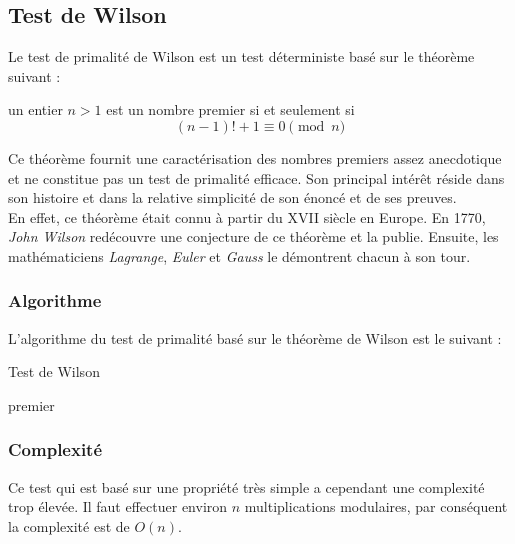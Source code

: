 \subsection{Test de Wilson}
	Le test de primalité de Wilson est un test déterministe basé sur le théorème suivant :
		
		\vspace{-1.5em}\begin{adjustwidth}{1.5cm}{1.5cm} 
		\begin{Th}
			un entier $n > 1$ est un nombre premier si et seulement si
			\[(n-1)! + 1 \equiv 0 \pmod n\]
		\end{Th}
		\end{adjustwidth}\vspace{0.5em}
		
	Ce théorème fournit une caractérisation des nombres premiers assez anecdotique et ne constitue pas un test de primalité efficace. Son principal intérêt réside dans son histoire et dans la relative simplicité de son énoncé et de ses preuves.\\
	En effet, ce théorème était connu à partir du XVII siècle en Europe. En 1770, \textit{John Wilson} redécouvre une conjecture de ce théorème et la publie. Ensuite, les mathématiciens \textit{Lagrange}, \textit{Euler} et \textit{Gauss} le démontrent chacun à son tour. 
		
	\subsubsection*{Algorithme}
		L'algorithme du test de primalité basé sur le théorème de Wilson est le suivant :\\
		
		\begin{algorithm}[H]
			\caption{Test de Wilson}\label{Wil}
			 { 
				{\Retour premier\;}
			} 
		\end{algorithm}	
		
	\subsubsection*{Complexité}
		Ce test qui est basé sur une propriété très simple a cependant une complexité trop élevée. Il faut effectuer environ $n$ multiplications modulaires, par conséquent la complexité est de $O(n)$.
